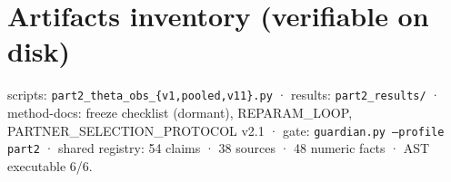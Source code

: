 \documentclass[10pt,twocolumn]{article}
\begin{document}
\section*{Artifacts inventory (verifiable on disk)}
{\small scripts: \texttt{part2\_theta\_obs\_\{v1,pooled,v11\}.py} · results: \texttt{part2\_results/} · method-docs: freeze checklist (dormant), REPARAM\_LOOP, PARTNER\_SELECTION\_PROTOCOL v2.1 · gate: \texttt{guardian.py --profile part2} · shared registry: 54 claims · 38 sources · 48 numeric facts · AST executable 6/6.}
\end{document}
